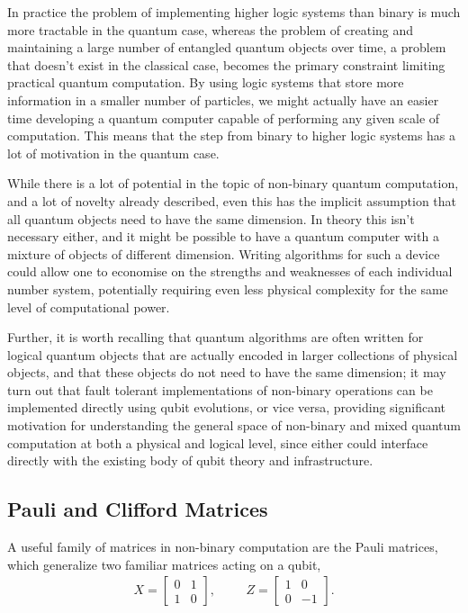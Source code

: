 In practice the problem of implementing higher logic systems than binary is much more tractable in the quantum case, whereas the problem of creating and maintaining a large number of entangled quantum objects over time, a problem that doesn't exist in the classical case, becomes the primary constraint limiting practical quantum computation. By using logic systems that store more information in a smaller number of particles, we might actually have an easier time developing a quantum computer capable of performing any given scale of computation. This means that the step from binary to higher logic systems has a lot of motivation in the quantum case.

While there is a lot of potential in the topic of non-binary quantum computation, and a lot of novelty already described, even this has the implicit assumption that all quantum objects need to have the same dimension. In theory this isn't necessary either, and it might be possible to have a quantum computer with a mixture of objects of different dimension. Writing algorithms for such a device could allow one to economise on the strengths and weaknesses of each individual number system, potentially requiring even less physical complexity for the same level of computational power.

Further, it is worth recalling that quantum algorithms are often written for logical quantum objects that are actually encoded in larger collections of physical objects, and that these objects do not need to have the same dimension; it may turn out that fault tolerant implementations of non-binary operations can be implemented directly using qubit evolutions, or vice versa, providing significant motivation for understanding the general space of non-binary and mixed quantum computation at both a physical and logical level, since either could interface directly with the existing body of qubit theory and infrastructure.

\subsection{Pauli and Clifford Matrices}\label{pauli}
A useful family of matrices in non-binary computation are the Pauli matrices, which generalize two familiar matrices acting on a qubit,
\begin{align*}
X = \left[\begin{matrix}
0&1\\
1&0
\end{matrix}\right],
&&&
Z = \left[\begin{matrix}
1&0\\
0&-1
\end{matrix}\right].
\end{align*}

